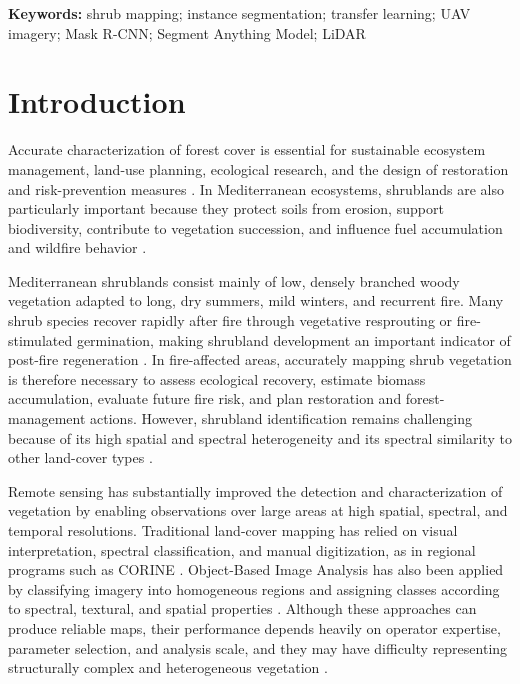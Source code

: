 \documentclass[12pt,a4paper]{article}
\begin{document}
\noindent
\textbf{Keywords:}
shrub mapping; instance segmentation; transfer learning; UAV imagery; Mask R-CNN; Segment Anything Model; LiDAR

\section{Introduction}

Accurate characterization of forest cover is essential for sustainable ecosystem management, land-use planning, ecological research, and the design of restoration and risk-prevention measures \citep{chazdon2008beyond, townshend2012global}. In Mediterranean ecosystems, shrublands are also particularly important because they protect soils from erosion, support biodiversity, contribute to vegetation succession, and influence fuel accumulation and wildfire behavior \citep{keeley2005determinants}.

Mediterranean shrublands consist mainly of low, densely branched woody vegetation adapted to long, dry summers, mild winters, and recurrent fire. Many shrub species recover rapidly after fire through vegetative resprouting or fire-stimulated germination, making shrubland development an important indicator of post-fire regeneration \citep{keeley1986resilience,pausas2008wildfires}. In fire-affected areas, accurately mapping shrub vegetation is therefore necessary to assess ecological recovery, estimate biomass accumulation, evaluate future fire risk, and plan restoration and forest-management actions. However, shrubland identification remains challenging because of its high spatial and spectral heterogeneity and its spectral similarity to other land-cover types \citep{liu2026underestimated,west2025landsat}.

Remote sensing has substantially improved the detection and characterization of vegetation by enabling observations over large areas at high spatial, spectral, and temporal resolutions. Traditional land-cover mapping has relied on visual interpretation, spectral classification, and manual digitization, as in regional programs such as CORINE \citep{grekousis2015overview}. Object-Based Image Analysis has also been applied by classifying imagery into homogeneous regions and assigning classes according to spectral, textural, and spatial properties \citep{blaschke2010object,soubry2022mapping}. Although these approaches can produce reliable maps, their performance depends heavily on operator expertise, parameter selection, and analysis scale, and they may have difficulty representing structurally complex and heterogeneous vegetation \citep{mishra2014mapping}.
\end{document}
